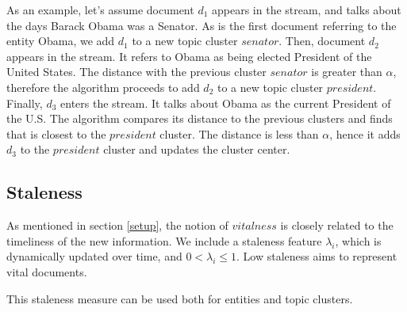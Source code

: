 \documentclass{article}
\begin{document}

As an example, let's assume document $d_1$ appears in the stream, and talks about the days Barack Obama was a Senator. As is the first document referring to the entity Obama, we add $d_1$ to a new topic cluster $senator$. Then, document $d_2$ appears in the stream. It refers to Obama as being elected President of the United States. The distance with the previous cluster $senator$ is greater than $\alpha$, therefore the algorithm proceeds to add $d_2$ to a new topic cluster $president$. Finally, $d_3$ enters the stream. It talks about Obama as the current President of the U.S. The algorithm compares its distance to the previous clusters and finds that is closest to the $president$ cluster. The distance is less than $\alpha$, hence it adds $d_3$ to the $president$ cluster and updates the cluster center.

\subsection{Staleness}
\label{staleness}

As mentioned in section \ref{setup}, the notion of $vitalness$ is closely related to the timeliness of the new information. We include a staleness feature $\lambda_i$, which is dynamically updated over time, and $0 < \lambda_i \leq 1$. Low staleness aims to represent vital documents.

This staleness measure can be used both for entities and topic clusters.
\end{document}
